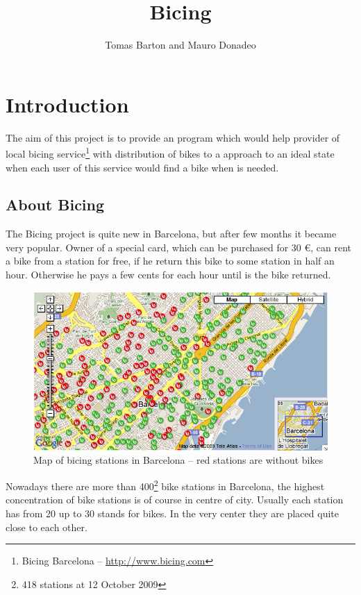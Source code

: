 \documentclass[a4paper,10pt]{report}
\title{Bicing}
\author{Tomas Barton and Mauro Donadeo}
\begin{document}
\maketitle


\chapter{Introduction}
The aim of this project is to provide an program which would help provider of local bicing service\footnote{Bicing Barcelona -- \url{http://www.bicing.com}} with distribution of bikes to a approach to an ideal state when each user of this service would find a bike when is needed. 

\section{About Bicing}
The Bicing project is quite new in Barcelona, but after few months it became very popular. Owner of a special card, which can be purchased for 30 \euro, can rent a bike from a station for free, if he return this bike to some station in half an hour. Otherwise he pays a few cents for each hour until is the bike returned. 

\begin{figure}[ht]
\begin{center}
\includegraphics[width=\textwidth]{images/bicing_map.png}
\caption{Map of bicing stations in Barcelona -- red stations are without bikes}
\label{img:bicing_map}
\end{center}
\end{figure}

Nowadays there are more than 400\footnote{418 stations at 12 October 2009} bike stations in Barcelona, the highest concentration of bike stations is of course in centre of city. Usually each station has from 20 up to 30 stands for bikes. In the very center they are placed quite close to each other.
\end{document}
